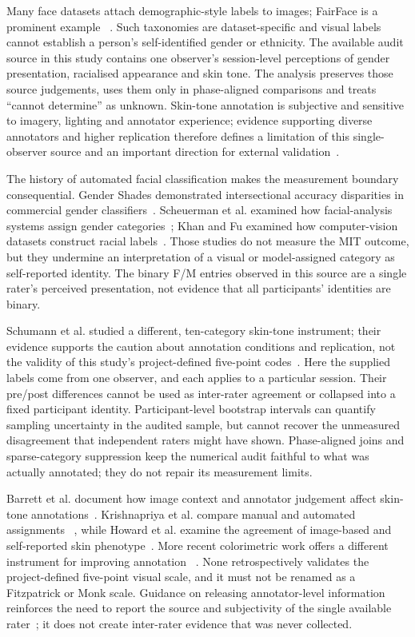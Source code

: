 Many face datasets attach demographic-style labels to images; FairFace is a prominent example
~\cite{Karkkainen2021FairFace}. Such taxonomies are dataset-specific and visual labels cannot
establish a person's self-identified gender or ethnicity. The available audit source in this
study contains one observer's session-level perceptions of gender presentation, racialised
appearance and skin tone. The analysis preserves those source judgements, uses them only in
phase-aligned comparisons and treats ``cannot determine'' as unknown. Skin-tone annotation is
subjective and sensitive to imagery, lighting and annotator experience; evidence supporting
diverse annotators and higher replication therefore defines a limitation of this single-observer
source and an important direction for external validation~\cite{Schumann2023}.

The history of automated facial classification makes the measurement boundary consequential.
Gender Shades demonstrated intersectional accuracy disparities in commercial gender
classifiers~\cite{BuolamwiniGebru2018}. Scheuerman et al. examined how facial-analysis systems
assign gender categories~\cite{Scheuerman2019}; Khan and Fu examined how computer-vision
datasets construct racial labels~\cite{KhanFu2021}. Those studies do not measure the MIT outcome,
but they
undermine an interpretation of a visual or model-assigned category as self-reported identity.
The binary F/M entries observed in this source are a single rater's perceived presentation,
not evidence that all participants' identities are binary.

Schumann et al. studied a different, ten-category skin-tone instrument; their evidence supports
the caution about annotation conditions and replication, not the validity of this study's
project-defined five-point codes~\cite{Schumann2023}. Here the supplied labels come from one
observer, and each applies to a particular session. Their pre/post differences cannot be used as
inter-rater agreement or collapsed into a fixed participant identity. Participant-level bootstrap
intervals can quantify sampling uncertainty in the audited sample, but cannot recover the
unmeasured disagreement that independent raters might have shown. Phase-aligned joins and
sparse-category suppression keep the numerical audit faithful to what was actually annotated;
they do not repair its measurement limits.

Barrett et al. document how image context and annotator judgement affect skin-tone
annotations~\cite{Barrett2023}. Krishnapriya et al. compare manual and automated assignments
~\cite{Krishnapriya2022}, while Howard et al. examine the agreement of image-based and
self-reported skin phenotype~\cite{Howard2021}.
More recent colorimetric work offers a different instrument for improving annotation
~\cite{Cook2025}. None retrospectively validates the project-defined five-point visual
scale, and it must not be renamed as a Fitzpatrick or Monk scale. Guidance on releasing
annotator-level information reinforces the need to report the source and subjectivity of the
single available rater~\cite{Prabhakaran2021}; it does not create inter-rater evidence that
was never collected.


